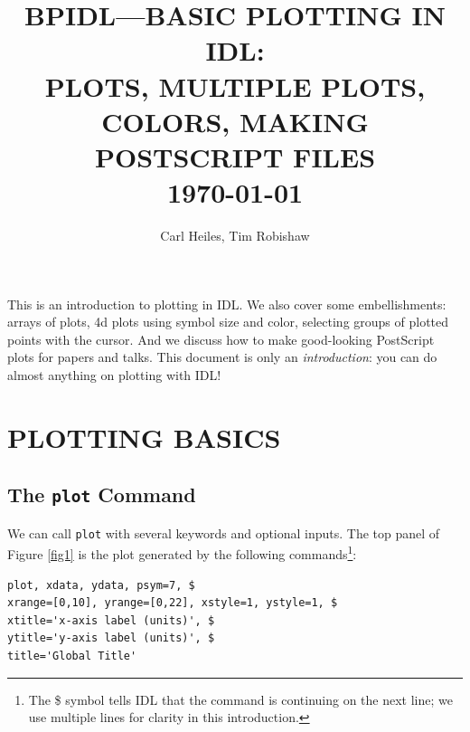 \documentclass[psfig,preprint]{aastex}
\begin{document}
 

\title{BPIDL---BASIC PLOTTING IN IDL: \\ 
PLOTS, MULTIPLE PLOTS, COLORS, MAKING POSTSCRIPT FILES \\ \today}

\author{Carl Heiles, Tim Robishaw} 

This is an introduction to plotting in IDL. We also cover some
embellishments: arrays of plots, 4d plots using symbol size and color,
selecting groups of plotted points with the cursor. And we discuss how
to make good-looking PostScript plots for papers and talks.  This
document is only an {\it introduction}: you can do almost anything on
plotting with IDL!

\tableofcontents

\section{PLOTTING BASICS}

\subsection{The {\tt plot} Command}

We can call {\tt plot} with several keywords and optional inputs.
The top panel of Figure \ref{fig1} is the plot generated by the following
commands\footnote{The \$ symbol tells IDL that the command is continuing on the
next line; we use multiple lines for clarity in this introduction.}:

\begin{verbatim}
plot, xdata, ydata, psym=7, $
xrange=[0,10], yrange=[0,22], xstyle=1, ystyle=1, $
xtitle='x-axis label (units)', $
ytitle='y-axis label (units)', $
title='Global Title'
\end{verbatim}
\end{document}
